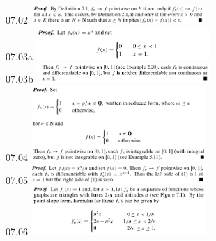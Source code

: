 \documentclass[8pt,landscape]{article}
\begin{document}
\begin{multicols}{3}
    07.02
    \includegraphics[width=250]{07_02.png} \\
    07.03a
    \includegraphics[width=250]{07_03a.png} \\
    07.03b
    \includegraphics[width=250]{07_03b.png} \\
    07.04
    \includegraphics[width=250]{07_04.png} \\
    07.05
    \includegraphics[width=250]{07_05.png} \\
    07.06
    \includegraphics[width=250]{07_06a.png} \\

\end{multicols}
\end{document}
